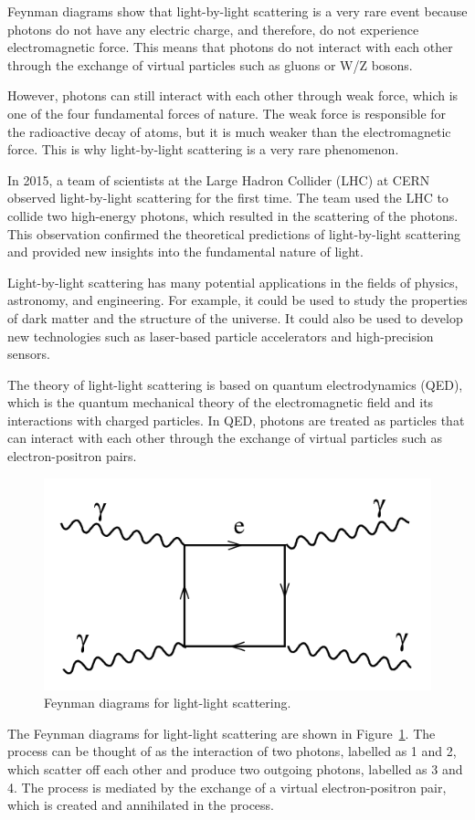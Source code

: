 \documentclass{paper}
\begin{document}
Feynman diagrams show that light-by-light scattering is a very rare event because photons do not have any electric charge, and therefore, do not experience electromagnetic force. This means that photons do not interact with each other through the exchange of virtual particles such as gluons or W/Z bosons.

However, photons can still interact with each other through weak force, which is one of the four fundamental forces of nature. The weak force is responsible for the radioactive decay of atoms, but it is much weaker than the electromagnetic force. This is why light-by-light scattering is a very rare phenomenon.

In 2015, a team of scientists at the Large Hadron Collider (LHC) at CERN observed light-by-light scattering for the first time. The team used the LHC to collide two high-energy photons, which resulted in the scattering of the photons. This observation confirmed the theoretical predictions of light-by-light scattering and provided new insights into the fundamental nature of light.

Light-by-light scattering has many potential applications in the fields of physics, astronomy, and engineering. For example, it could be used to study the properties of dark matter and the structure of the universe. It could also be used to develop new technologies such as laser-based particle accelerators and high-precision sensors.

The theory of light-light scattering is based on quantum electrodynamics (QED), which is the quantum mechanical theory of the electromagnetic field and its interactions with charged particles. In QED, photons are treated as particles that can interact with each other through the exchange of virtual particles such as electron-positron pairs.

\begin{figure}[h]
	\centering
	\includegraphics[width=0.5\linewidth]{figures/Feynman-diagram.png}
	\caption{Feynman diagrams for light-light scattering.}
	\label{fig:light-light-scattering-feynman}
\end{figure}
The Feynman diagrams for light-light scattering are shown in Figure~\ref{fig:light-light-scattering-feynman}. The process can be thought of as the interaction of two photons, labelled as 1 and 2, which scatter off each other and produce two outgoing photons, labelled as 3 and 4. The process is mediated by the exchange of a virtual electron-positron pair, which is created and annihilated in the process.
\end{document}
